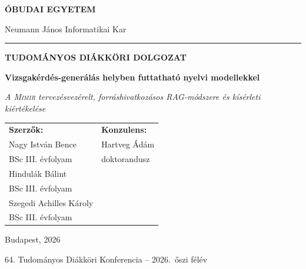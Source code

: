 \documentclass[12pt,a4paper,oneside]{report}
\newcommand{\Kar}{Neumann János Informatikai Kar}
\newcommand{\SzerzoA}{Nagy István Bence}
\newcommand{\SzerzoAszak}{BSc III. évfolyam}
\newcommand{\SzerzoB}{Hindulák Bálint}
\newcommand{\SzerzoBszak}{BSc III. évfolyam}
\newcommand{\SzerzoC}{Szegedi Achilles Károly}
\newcommand{\SzerzoCszak}{BSc III. évfolyam}
\newcommand{\Konzulens}{Hartveg Ádám}
\newcommand{\KonzulensBeosztas}{doktorandusz}
\newcommand{\Ev}{2026}
\newcommand{\DolgozatCim}{Vizsgakérdés-generálás helyben futtatható nyelvi modellekkel}
\newcommand{\DolgozatAlcim}{A \textsc{Mimir} tervezésvezérelt, forráshivatkozásos RAG-módszere és kísérleti kiértékelése}
\newcommand{\1}{\mathbb{1}}
\theoremstyle{definition}
\theoremstyle{remark}
\begin{document}
\setcounter{tocdepth}{2}

\begin{titlepage}
\begin{center}
\begin{singlespace}
{\Large\bfseries ÓBUDAI EGYETEM\par}
\vspace{2mm}
{\large \Kar\par}
\vspace{2mm}
\rule{\textwidth}{0.6pt}\par
\vspace{2.8cm}
{\LARGE\bfseries TUDOMÁNYOS DIÁKKÖRI DOLGOZAT\par}
\vspace{2.2cm}
{\Large\bfseries \DolgozatCim\par}
\vspace{6mm}
{\large\itshape \DolgozatAlcim\par}
\vfill
\begin{tabular}{@{}p{}p{}@{}}
\textbf{Szerzők:} & \textbf{Konzulens:}\\[1mm]
\SzerzoA & \Konzulens\\
\small\SzerzoAszak & \small\KonzulensBeosztas\\[3mm]
\SzerzoB & \\
\small\SzerzoBszak & \\[3mm]
\SzerzoC & \\
\small\SzerzoCszak & \\
\end{tabular}
\vspace{2.4cm}

{\large Budapest, \Ev\par}
\vspace{2mm}
{\small 64. Tudományos Diákköri Konferencia -- \Ev.\ őszi félév\par}
\end{singlespace}
\end{center}
\end{titlepage}

\setcounter{page}{2}


\cleardoublepage
{}
{}
\begin{singlespace}
\tableofcontents
\end{singlespace}
\end{document}
